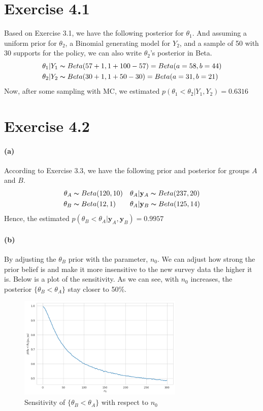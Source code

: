 \documentclass[11pt, letterpaper]{article}
\begin{document}
\section{Exercise 4.1}
Based on Exercise 3.1, we have the following posterior for $\theta_1$. And assuming a uniform prior for $\theta_2$, a Binomial generating model for $Y_2$, and a sample of 50 with 30 supports for the policy, we can also write $\theta_2$'s posterior in Beta.
\begin{align*}
    \theta_1|Y_1 &\thicksim Beta(57+1, 1+100-57) = Beta(a=58, b=44) \\
    \theta_2|Y_2 &\thicksim Beta(30+1, 1+50-30) = Beta(a=31, b=21)
\end{align*}
Now, after some sampling with MC, we estimated $p(\theta_1 < \theta_2|Y_1, Y_2) = 0.6316$


\section{Exercise 4.2}
\paragraph{(a)}
According to Exercise 3.3, we have the following prior and posterior for groups $A$ and $B$.
\begin{align*}
    \theta_A &\thicksim Beta(120, 10) && \theta_A|\mathbf{y}_A \thicksim Beta(237, 20) \\
    \theta_B &\thicksim Beta(12, 1) && \theta_A|\mathbf{y}_B \thicksim Beta(125, 14)
\end{align*}
Hence, the estimated $p(\theta_B < \theta_A|\mathbf{y}_A, \mathbf{y}_B) = 0.9957$


\paragraph{(b)}
By adjusting the $\theta_B$ prior with the parameter, $n_0$. We can adjust how strong the prior belief is and make it more insensitive to the new survey data the higher it is. Below is a plot of the sensitivity. As we can see, with $n_0$ increases, the posterior $\{\theta_B < \theta_A\}$ stay closer to 50\%. 
\begin{figure}[!h]
  \centering
  \includegraphics[width=0.7\textwidth]{4.2.b.png}
  \captionsetup{justification=centering}
  \caption{Sensitivity of $\{\theta_B < \theta_A\}$ with respect to $n_0$}
\end{figure}
\end{document}
